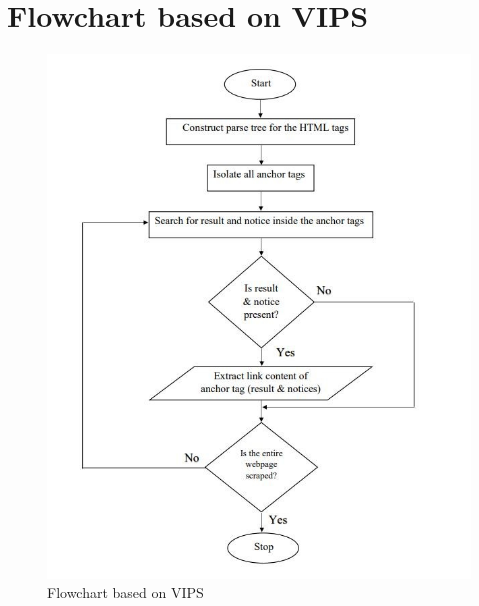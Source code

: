 \section*{Flowchart based on VIPS}
\begin{figure}[h]
\centering
    \includegraphics[scale=0.7]{images/vips1.jpg}
    \caption{Flowchart based on VIPS}
    \label{fig:my_label}
\end{figure}
